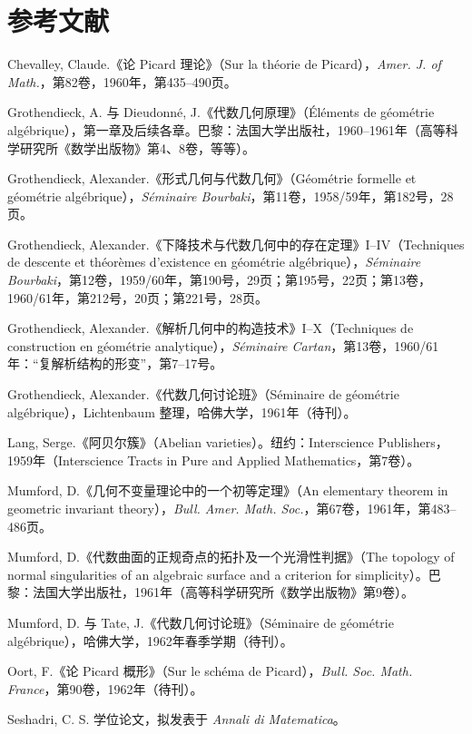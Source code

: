 \section*{参考文献}
\begin{enumerate}[label={[\arabic*]},leftmargin=2.6em]
\item Chevalley, Claude.《论 Picard 理论》（Sur la théorie de Picard），\emph{Amer. J. of Math.}，第82卷，1960年，第435--490页。
\item Grothendieck, A. 与 Dieudonné, J.《代数几何原理》（Éléments de géométrie algébrique），第一章及后续各章。巴黎：法国大学出版社，1960--1961年（高等科学研究所《数学出版物》第4、8卷，等等）。
\item Grothendieck, Alexander.《形式几何与代数几何》（Géométrie formelle et géométrie algébrique），\emph{Séminaire Bourbaki}，第11卷，1958/59年，第182号，28页。
\item Grothendieck, Alexander.《下降技术与代数几何中的存在定理》I--IV（Techniques de descente et théorèmes d'existence en géométrie algébrique），\emph{Séminaire Bourbaki}，第12卷，1959/60年，第190号，29页；第195号，22页；第13卷，1960/61年，第212号，20页；第221号，28页。
\item Grothendieck, Alexander.《解析几何中的构造技术》I--X（Techniques de construction en géométrie analytique），\emph{Séminaire Cartan}，第13卷，1960/61年：“复解析结构的形变”，第7--17号。
\item Grothendieck, Alexander.《代数几何讨论班》（Séminaire de géométrie algébrique），Lichtenbaum 整理，哈佛大学，1961年（待刊）。
\item Lang, Serge.《阿贝尔簇》（Abelian varieties）。纽约：Interscience Publishers，1959年（Interscience Tracts in Pure and Applied Mathematics，第7卷）。
\item Mumford, D.《几何不变量理论中的一个初等定理》（An elementary theorem in geometric invariant theory），\emph{Bull. Amer. Math. Soc.}，第67卷，1961年，第483--486页。
\item Mumford, D.《代数曲面的正规奇点的拓扑及一个光滑性判据》（The topology of normal singularities of an algebraic surface and a criterion for simplicity）。巴黎：法国大学出版社，1961年（高等科学研究所《数学出版物》第9卷）。
\item Mumford, D. 与 Tate, J.《代数几何讨论班》（Séminaire de géométrie algébrique），哈佛大学，1962年春季学期（待刊）。
\item Oort, F.《论 Picard 概形》（Sur le schéma de Picard），\emph{Bull. Soc. Math. France}，第90卷，1962年（待刊）。
\item Seshadri, C. S. 学位论文，拟发表于 \emph{Annali di Matematica}。
\end{enumerate}
